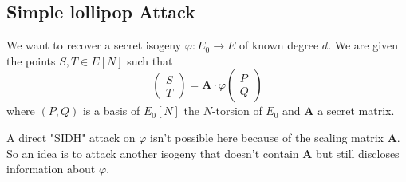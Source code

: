 \documentclass[12pt,a4paper]{article}
\begin{document}
		\subsection{Simple lollipop Attack}

		We want to recover a secret isogeny $\varphi:E_0\to E$ of known degree $d$. We are given
		the points $S,T\in E[N]$ such that
		\[
			\begin{pmatrix} S \\ T \end{pmatrix} = \mathbf A\cdot \varphi \begin{pmatrix} P \\ Q \end{pmatrix}
		\] 
		where $(P,Q)$ is a basis of  $E_0[N]$ the $N$-torsion of $E_0$ and  $\mathbf A$ a secret
		matrix.


		A direct "SIDH" attack on $\varphi$ isn't possible here because of the scaling matrix
		$\mathbf A$. So an idea is to attack another isogeny that doesn't contain $\mathbf A$
		but still discloses information about $\varphi$.
\end{document}
